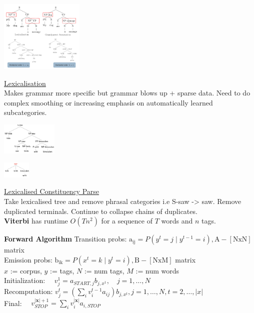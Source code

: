 \documentclass[8pt]{extarticle} %
\begin{document}
\begin{multicols*}{3}
\begin{center}
    \includegraphics*[width=0.3\textwidth]{media/markovisation.png}
\end{center}

\underline{Lexicalisation}\\
Makes grammar more specific but grammar blows up + sparse data. Need to do complex smoothing or increasing emphasis on automatically learned subcategories. 

\begin{center}
    \includegraphics[width=0.2\textwidth]{media/lexicalisation.png}
\end{center}
\begin{center}
    \includegraphics[width=0.1\textwidth]{media/collapse.png}
\end{center}

\underline{Lexicalised Constituency Parse}\\
Take lexicalised tree and remove phrasal categories i.e S-saw -> saw. Remove duplicated terminals. Continue to collapse chains of duplicates.\\
\textbf{Viterbi} has runtime $O(Tn^2)$ for a sequence of $T$ words and $n$ tags. 

\textbf{Forward Algorithm}
Transition probs: $\mathrm{a}_{\mathrm{ij}}=P\left(y^t=j \mid y^{t-1}=i\right), \mathrm{A}-[\mathrm{NxN}]$ matrix \\
Emission probs: $\mathrm{b}_{\mathrm{ik}}=P\left(x^t=k \mid y^t=i\right), \mathrm{B}-[\mathrm{NxM}]$ matrix\\
$x$ := corpus, $y$ := tags, $N$ := num tags, $M$ := num words\\
Initialization: $\quad v_j^1=a_{S T A R T, j} b_{j, x^1}, \quad j=1, \ldots, N$\\
Recomputation: $v_j^t=\left(\sum_i v_i^{t-1} a_{i j}\right) b_{j, x^t}, j=1, \ldots, N, t=2, \ldots,|x|$\\
Final: $\quad v_{S T O P}^{|\mathbf{x}|+1}=\sum_i v_i^{|\mathbf{x}|} a_{i, S T O P}$


\end{multicols*}
\end{document}
